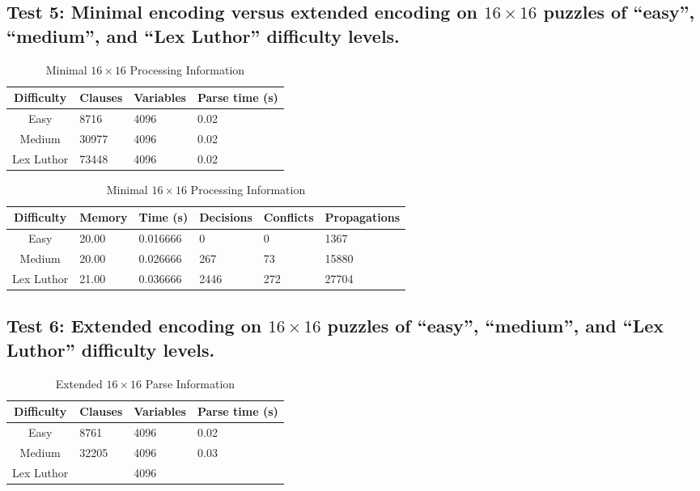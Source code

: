\documentclass[conference,draftclsnofoot]{IEEEtran}
\begin{document}
\subsection{Test 5: Minimal encoding versus extended encoding on $16 \times 16$ puzzles of
``easy'', ``medium'', and ``Lex Luthor'' difficulty levels.}
\FloatBarrier
\begin{table}[!h]
	\centering
	\begin{tabular}{c | l l l}
		Difficulty & Clauses & Variables & Parse time (s) \\\hline
		Easy	& 8716 & 4096 & 0.02\\
		Medium 	& 30977 & 4096 & 0.02\\
		Lex Luthor & 73448 & 4096 & 0.02\\
	\end{tabular}
	\caption{Minimal $16 \times 16$ Parse Information}
	\label{tab:summary}
	\begin{tabular}{c | l l p{20pt} p{20pt}  l }
		Difficulty & Memory & Time (s) & Decisions &
		Conflicts & Propagations \\\hline
		Easy 		& 20.00 & 0.016666 & 0  & 0  & 1367\\
		Medium 		& 20.00 & 0.026666 & 267 & 73 & 15880\\
		Lex Luthor 	& 21.00 & 0.036666 & 2446 & 272 & 27704
	\end{tabular}
	\caption{Minimal $16 \times 16$ Processing Information}
	\label{tab:summary}
\end{table}
\FloatBarrier


\subsection{Test 6: Extended encoding	on $16 \times 16$ puzzles of ``easy'',
``medium'', and ``Lex Luthor'' difficulty levels.}
\FloatBarrier
\begin{table}[!h]
	\centering
	\begin{tabular}{c | l l l}
		Difficulty & Clauses & Variables & Parse time (s) \\\hline
		Easy	& 8761 & 4096 & 0.02\\
		Medium 	& 32205 & 4096 & 0.03\\
		Lex Luthor & & 4096 & \\
	\end{tabular}
	\caption{Extended $16 \times 16$ Parse Information}
	\label{tab:summary}
\end{table}
\end{document}
